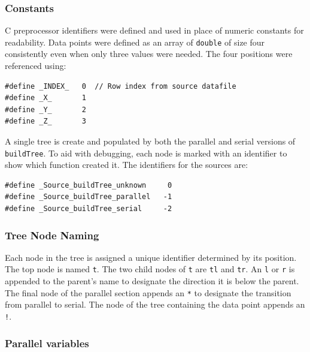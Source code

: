 \documentclass{article}
\begin{document}
\subsubsection{Constants}\label{sec:constants}

C preprocessor identifiers were defined and used in place of numeric constants for readability. Data points were defined as an array of \texttt{double} of size four consistently even when only three values were needed. The four positions were referenced using:

\lstset{language=C++, keepspaces=true}
\begin{lstlisting}
#define _INDEX_   0  // Row index from source datafile
#define _X_       1
#define _Y_       2
#define _Z_       3
\end{lstlisting}

A single tree is create and populated by both the parallel and serial versions of \texttt{buildTree}. To aid with debugging, each node is marked with an identifier to show which function created it. The identifiers for the sources are:

\lstset{language=C++, keepspaces=true}
\begin{lstlisting}
#define _Source_buildTree_unknown     0
#define _Source_buildTree_parallel   -1
#define _Source_buildTree_serial     -2
\end{lstlisting}

%
%

\subsubsection{Tree Node Naming}

Each node in the tree is assigned a unique identifier determined by its position. The top node is named \texttt{t}. The two child nodes of \texttt{t} are \texttt{tl} and \texttt{tr}. An \texttt{l} or \texttt{r} is appended to the parent's name to designate the direction it is below the parent. The final node of the parallel section appends an \texttt{*} to designate the transition from parallel to serial. The node of the tree containing the data point appends an \texttt{!}.


%
%

\subsubsection{Parallel variables}
\end{document}
